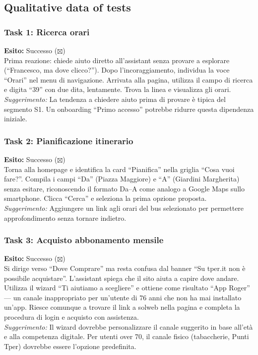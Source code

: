 ﻿\documentclass[11pt,a4paper]{article}
\begin{document}
\subsection*{Qualitative data of tests}
\begin{tcolorbox}[base]

\subsubsection*{Task 1: Ricerca orari}
\noindent\textbf{Esito:} Successo ($\boxtimes$)\\[0.2cm]
Prima reazione: chiede aiuto diretto all'assistant senza
provare a esplorare (``Francesco, ma dove clicco?''). Dopo
l'incoraggiamento, individua la voce ``Orari'' nel menu di
navigazione. Arrivata alla pagina, utilizza il campo di
ricerca e digita ``39'' con due dita, lentamente. Trova la
linea e visualizza gli orari.\\[0.2cm]
\textit{Suggerimento:} La tendenza a chiedere aiuto prima di
provare è tipica del segmento S1. Un onboarding ``Primo
accesso'' potrebbe ridurre questa dipendenza iniziale.

\vspace{0.3cm}

\subsubsection*{Task 2: Pianificazione itinerario}
\noindent\textbf{Esito:} Successo ($\boxtimes$)\\[0.2cm]
Torna alla homepage e identifica la card ``Pianifica'' nella
griglia ``Cosa vuoi fare?''. Compila i campi ``Da'' (Piazza
Maggiore) e ``A'' (Giardini Margherita) senza esitare,
riconoscendo il formato Da--A come analogo a Google Maps
sullo smartphone. Clicca ``Cerca'' e seleziona la prima
opzione proposta.\\[0.2cm]
\textit{Suggerimento:} Aggiungere un link agli orari del bus
selezionato per permettere approfondimento senza tornare
indietro.

\vspace{0.3cm}

\subsubsection*{Task 3: Acquisto abbonamento mensile}
\noindent\textbf{Esito:} Successo ($\boxtimes$)\\[0.2cm]
Si dirige verso ``Dove Comprare'' ma resta confusa dal
banner ``Su tper.it non è possibile acquistare''. L'assistant
spiega che il sito aiuta a capire dove andare. Utilizza il
wizard ``Ti aiutiamo a scegliere'' e ottiene come risultato
``App Roger'' --- un canale inappropriato per un'utente di
76 anni che non ha mai installato un'app. Riesce comunque
a trovare il link a solweb nella pagina e completa la
procedura di login e acquisto con assistenza.\\[0.2cm]
\textit{Suggerimento:} Il wizard dovrebbe personalizzare il
canale suggerito in base all'età e alla competenza digitale.
Per utenti over 70, il canale fisico (tabaccherie, Punti
Tper) dovrebbe essere l'opzione predefinita.


\end{tcolorbox}
\end{document}
